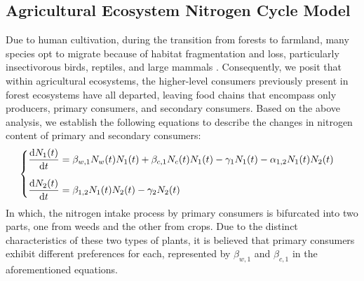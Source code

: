 \documentclass{mcmthesis}
\begin{document}
\subsection{Agricultural Ecosystem Nitrogen Cycle Model}
Due to human cultivation, during the transition from forests to farmland, many species opt to migrate because of habitat fragmentation and loss, particularly insectivorous birds, reptiles, and large mammals \cite{Laurance_Vasconcelos_Lovejoy_2000}. Consequently, we posit that within agricultural ecosystems, the higher-level consumers previously present in forest ecosystems have all departed, leaving food chains that encompass only producers, primary consumers, and secondary consumers. Based on the above analysis, we establish the following equations to describe the changes in nitrogen content of primary and secondary consumers:
\begin{align}
\label{eq:model2_food_chain}
    \begin{cases}
        \displaystyle \vspace{10pt}
    \frac{\mathrm{d}N_1(t)}{\mathrm{d}t}=\beta _{w,1}N_{w}(t)N_1(t)+\beta _{c,1}N_{c}(t)N_1(t)-\gamma _1N_1(t)-\alpha _{1,2}N_1(t)N_2(t)\\
        \displaystyle
	\frac{\mathrm{d}N_2(t)}{\mathrm{d}t}=\beta _{1,2}N_{1}(t)N_2(t)-\gamma _2N_2(t)\\
\end{cases}
\end{align}
In which, the nitrogen intake process by primary consumers is bifurcated into two parts, one from weeds and the other from crops. Due to the distinct characteristics of these two types of plants, it is believed that primary consumers exhibit different preferences for each, represented by $\beta _{w,1}$ and $\beta _{c,1}$ in the aforementioned equations.
\end{document}
